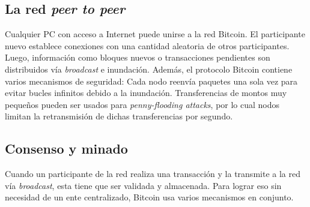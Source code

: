 \subsection{La red \textit{peer to peer}}
Cualquier PC con acceso a Internet puede unirse a la red Bitcoin. El participante nuevo establece conexiones con una cantidad aleatoria de otros participantes. Luego, información como bloques nuevos o transacciones pendientes son distribuidos vía \textit{broadcast} e inundación. Además, el protocolo Bitcoin contiene varios mecanismos de seguridad: Cada nodo reenvía paquetes una sola vez para evitar bucles infinitos debido a la inundación. Transferencias de montos muy pequeños pueden ser usados para \textit{penny-flooding attacks}, por lo cual nodos limitan la retransmisión de dichas transferencias por segundo.
\subsection{Consenso y minado}
Cuando un participante de la red realiza una transacción y la transmite a la red vía \textit{broadcast}, esta tiene que ser validada y almacenada. Para lograr eso sin necesidad de un ente centralizado, Bitcoin usa varios mecanismos en conjunto.
